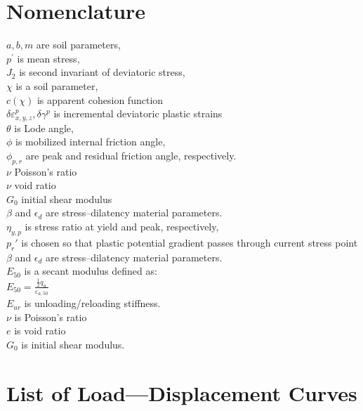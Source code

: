 \documentclass[a4paper, nobind]{templates/ociamthesis}
\begin{document}
\startappendices

\hypertarget{nomenclature}{%
\chapter{Nomenclature}\label{nomenclature}}

\(a, b, m\) are soil parameters,\\
\(p^{'}\) is mean stress,\\
\(J_2\) is second invariant of deviatoric stress,\\
\(\chi\) is a soil parameter,\\
\(c(\chi)\) is apparent cohesion function\\
\(\delta \varepsilon_{x,y,z}^{p} , \delta \gamma^{p}\) is incremental deviatoric plastic strains\\
\(\theta\) is Lode angle,\\
\(\phi\) is mobilized internal friction angle,\\
\(\phi_{p,r}\) are peak and residual friction angle, respectively.\\
\(\nu\) Poisson's ratio\\
\(\nu\) void ratio\\
\(G_0\) initial shear modulus\\
\(\beta\) and \(\epsilon_d\) are stress--dilatency material parameters.\\
\(\eta_{y,p}\) is stress ratio at yield and peak, respectively,\\
\(p_r'\) is chosen so that plastic potential gradient passes through current stress point\\
\(\beta\) and \(\epsilon_d\) are stress--dilatency material parameters.\\
\(E_{50}\) is a secant modulus defined as:\\
\(E_{50} = \frac{\frac{1}{2}q_{u}}{\varepsilon_{a,50}}\)\\
\(E_{ur}\) is unloading/reloading stiffness.\\
\(\nu\) is Poisson's ratio\\
\(e\) is void ratio\\
\(G_0\) is initial shear modulus.

\hypertarget{list-of-loaddisplacement-curves}{%
\chapter{List of Load---Displacement Curves}\label{list-of-loaddisplacement-curves}}
\end{document}
